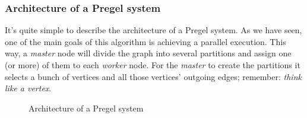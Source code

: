 \subsubsection{Architecture of a Pregel system}

It's quite simple to describe the architecture of a Pregel system. As we have seen, one of the main goals of this algorithm is achieving a parallel execution. This way, a \textit{master} node will divide the graph into several partitions and assign one (or more) of them to each \textit{worker} node. For the \textit{master} to create the partitions it selects a bunch of vertices and all those vertices' outgoing edges; remember: \textit{think like a vertex}.

\begin{figure}[H]
    \centering
    
    \caption[Architecture of a Pregel system]{Architecture of a Pregel system~\cite{10.1145/3349265}}
    \label{fig:architecture:pregel}
\end{figure}